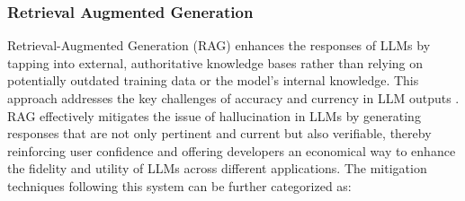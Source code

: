 \documentclass[11pt]{article}
\begin{document}
\subsubsection{Retrieval Augmented Generation}
\label{subsubsec:Retrieval Augmented Generation}
Retrieval-Augmented Generation (RAG) enhances the responses of LLMs by tapping into external, authoritative knowledge bases rather than relying on potentially outdated training data or the model's internal knowledge. This approach addresses the key challenges of accuracy and currency in LLM outputs \cite{kang2023ever}. RAG effectively mitigates the issue of hallucination in LLMs by generating responses that are not only pertinent and current but also verifiable, thereby reinforcing user confidence and offering developers an economical way to enhance the fidelity and utility of LLMs across different applications. The mitigation techniques following this system can be further categorized as: 
\end{document}
